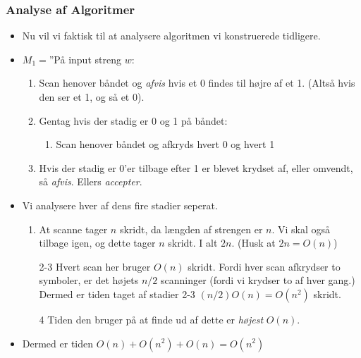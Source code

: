 \begin{frame}[allowframebreaks]
	\frametitle{Analyse af Algoritmer}
	\begin{itemize}
		\item Nu vil vi faktisk til at analysere algoritmen vi konstruerede tidligere.
		\item $M_{1} = $''På input streng $w$:
		      \begin{enumerate}
			      \item Scan henover båndet og \textit{afvis} hvis et 0 findes til højre af et 1. (Altså hvis den ser et 1, og så et 0).
			      \item Gentag hvis der stadig er 0 og 1 på båndet:
			            \begin{enumerate}
				            \item Scan henover båndet og afkryds hvert 0 og hvert 1
			            \end{enumerate}

			      \item Hvis der stadig er 0'er tilbage efter 1 er blevet krydset af, eller omvendt, så \textit{afvis}. Ellers \textit{accepter}.
		      \end{enumerate}

		\item Vi analysere hver af dens fire stadier seperat.
		      \begin{enumerate}
			      \item At scanne tager $n$ skridt, da længden af strengen er $n$. Vi skal også tilbage igen, og dette tager $n$ skridt. I alt $2n$. (Husk at $2n = O(n)$)
			      \item[2-3] Hvert scan her bruger $O(n)$ skridt. Fordi hver scan afkrydser to symboler, er det højets $n/2$ scanninger (fordi vi krydser to af hver gang.) Dermed er tiden taget af stadier 2-3 $(n/2)O(n) = O(n^{2})$ skridt.
			      \item[4] Tiden den bruger på at finde ud af dette er \textit{højest} $O(n)$.
		      \end{enumerate}
		\item Dermed er tiden $O(n) + O(n^{2})+O(n) = O(n^{2})$
	\end{itemize}


\end{frame}
